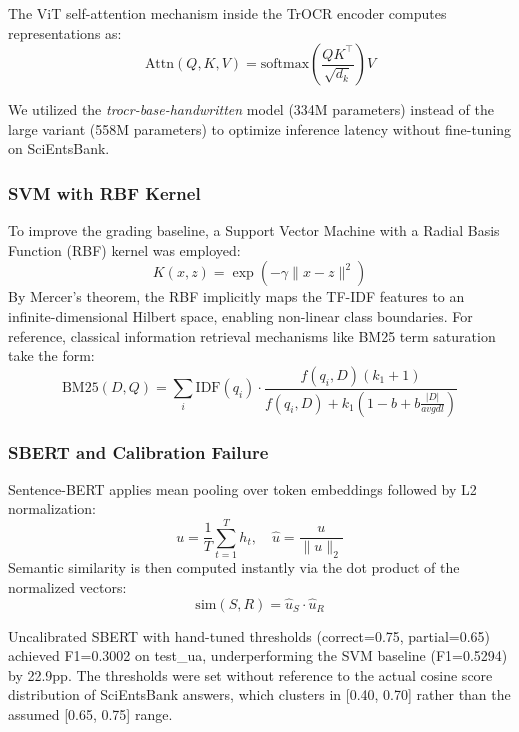 \documentclass[conference]{IEEEtran}
\begin{document}
The ViT \cite{dosovitskiy2021an} self-attention mechanism inside the TrOCR encoder computes representations as:
\begin{equation}
\text{Attn}(Q,K,V) = \text{softmax}\!\left(\frac{QK^\top}{\sqrt{d_k}}\right)V
\end{equation}

We utilized the \textit{trocr-base-handwritten} model (334M parameters) instead of the large variant (558M parameters) to optimize inference latency without fine-tuning on SciEntsBank.

\subsubsection{SVM with RBF Kernel}
To improve the grading baseline, a Support Vector Machine \cite{cortes1995support} with a Radial Basis Function (RBF) kernel was employed:
\begin{equation}
K(x,z) = \exp\!\left(-\gamma\|x-z\|^2\right)
\end{equation}
By Mercer's theorem, the RBF implicitly maps the TF-IDF features to an infinite-dimensional Hilbert space, enabling non-linear class boundaries. For reference, classical information retrieval mechanisms like BM25 term saturation \cite{robertson2009probabilistic} take the form:
\begin{equation}
\text{BM25}(D,Q) = \sum_{i} \text{IDF}(q_i) \cdot \frac{f(q_i,D)(k_1+1)}{f(q_i,D)+k_1(1-b+b\frac{|D|}{avgdl})}
\end{equation}

\subsubsection{SBERT and Calibration Failure}
Sentence-BERT \cite{reimers2019sentence} applies mean pooling over token embeddings followed by L2 normalization:
\begin{equation}
u = \frac{1}{T}\sum_{t=1}^T h_t,\quad \hat{u} = \frac{u}{\|u\|_2}
\end{equation}
Semantic similarity is then computed instantly via the dot product of the normalized vectors:
\begin{equation}
\text{sim}(S,R) = \hat{u}_S \cdot \hat{u}_R
\end{equation}

Uncalibrated SBERT with hand-tuned thresholds (correct=0.75, partial=0.65) achieved F1=0.3002 on test\_ua, underperforming the SVM baseline (F1=0.5294) by 22.9pp. The thresholds were set without reference to the actual cosine score distribution of SciEntsBank answers, which clusters in [0.40, 0.70] rather than the assumed [0.65, 0.75] range.
\end{document}
